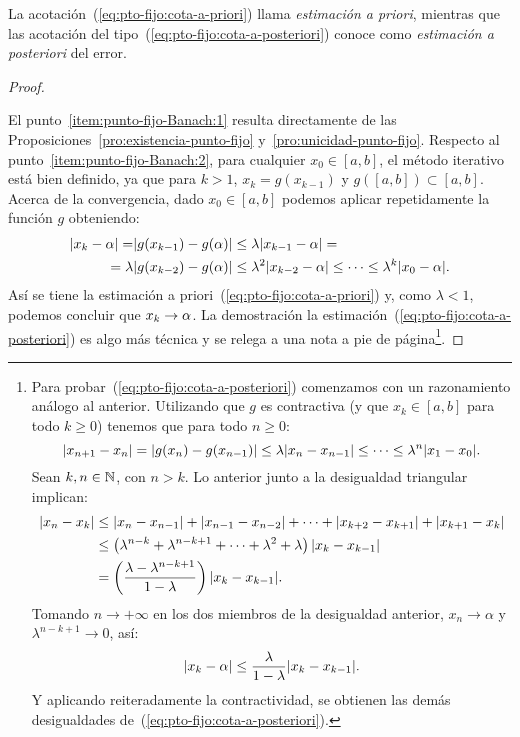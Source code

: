 La acotación~(\ref{eq:pto-fijo:cota-a-priori}) llama
\textit{estimación a priori}, mientras que
las acotación del tipo~(\ref{eq:pto-fijo:cota-a-posteriori}) conoce como
\textit{estimación a posteriori} del error.

\begin{proof}~\par
  El punto~\ref{item:punto-fijo-Banach:1} resulta
  directamente de las Proposiciones~\ref{pro:existencia-punto-fijo}
  y~\ref{pro:unicidad-punto-fijo}. Respecto al
  punto~\ref{item:punto-fijo-Banach:2}, para cualquier $x_0\in [a,b]$,
  el método iterativo está bien definido, ya que para $k>1$,
  $x_{k}=g(x_{k-1})$ y $g([a,b])\subset [a,b]$. Acerca de la
  convergencia, dado $x_0\in [a,b]$ podemos aplicar repetidamente la
  función $g$ obteniendo:
  \begin{equation}
    \begin{aligned}
      |x_k-\alpha| = &|g(x_{k-1})-g(\alpha)| \le \lambda
      |x_{k-1}-\alpha| = \\
      = \lambda &|g(x_{k-2})-g(\alpha)| \le \lambda^2
      |x_{k-2}-\alpha| \le \cdots \le \lambda^k |x_0-\alpha|.
    \end{aligned}\label{eq:1}
  \end{equation}
  Así se tiene la estimación a
  priori~(\ref{eq:pto-fijo:cota-a-priori}) y, como
  $\lambda<1$, podemos concluir que $x_k\to\alpha$.
  La demostración la estimación~(\ref{eq:pto-fijo:cota-a-posteriori})
  es algo más técnica y se relega a una nota a pie de página\footnote{
    Para probar~(\ref{eq:pto-fijo:cota-a-posteriori}) comenzamos con
    un razonamiento análogo al anterior. Utilizando que $g$ es
    contractiva (y que $x_k\in [a,b]$ para todo $k\ge 0$) tenemos que
    para todo $n \ge 0$:
    \begin{equation*}
      |x_{n+1}-x_{n}| =
      |g(x_{n})-g(x_{n-1})|\le\lambda|x_{n}-x_{n-1}| \le \cdots \le \lambda^n|x_1-x_0|.
    \end{equation*}
    Sean $k,n\in\operatorname{{\mathbb N}}$, con $n>k$. Lo anterior junto a la
    desigualdad triangular implican:
    \begin{align*}
      |x_n-x_k| &\le |x_n-x_{n-1}| + |x_{n-1}-x_{n-2}| + \cdots +
                  |x_{k+2}-x_{k+1}| + |x_{k+1}-x_{k}|
      \\
                &\le \left(\lambda^{n-k} + \lambda^{n-k+1} +\cdots+
                  \lambda^{2} + \lambda \right) |x_k-x_{k-1}|
      \\
                &=\left(\frac{\lambda-\lambda^{n-k+1}}{1-\lambda}\right)
                  |x_{k}-x_{k-1}|.
    \end{align*}
    Tomando $n\to+\infty$ en los dos miembros de la desigualdad
    anterior, $x_n\to\alpha$ y $\lambda^{n-k+1}\to 0$, así:
    $$
    |x_k-\alpha| \le \frac{\lambda}{1-\lambda}
    |x_{k}-x_{k-1}|.
    $$
    Y aplicando reiteradamente la contractividad, se obtienen las
    demás desigualdades de~(\ref{eq:pto-fijo:cota-a-posteriori}).
  }.
\end{proof}

